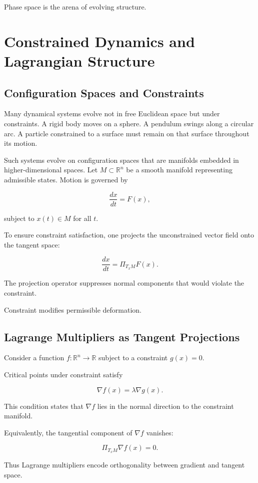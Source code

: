 \documentclass[12pt]{book}
\begin{document}
Phase space is the arena of evolving structure.

\chapter{Constrained Dynamics and Lagrangian Structure}

\section{Configuration Spaces and Constraints}

Many dynamical systems evolve not in free Euclidean space but under constraints. A rigid body moves on a sphere. A pendulum swings along a circular arc. A particle constrained to a surface must remain on that surface throughout its motion.

Such systems evolve on configuration spaces that are manifolds embedded in higher-dimensional spaces. Let $M \subset \mathbb{R}^n$ be a smooth manifold representing admissible states. Motion is governed by

\[
\frac{dx}{dt} = F(x),
\]

subject to $x(t) \in M$ for all $t$.

To ensure constraint satisfaction, one projects the unconstrained vector field onto the tangent space:

\[
\frac{dx}{dt} = \Pi_{T_x M} F(x).
\]

The projection operator suppresses normal components that would violate the constraint.

Constraint modifies permissible deformation.

\section{Lagrange Multipliers as Tangent Projections}

Consider a function $f : \mathbb{R}^n \to \mathbb{R}$ subject to a constraint $g(x) = 0$.

Critical points under constraint satisfy

\[
\nabla f(x) = \lambda \nabla g(x).
\]

This condition states that $\nabla f$ lies in the normal direction to the constraint manifold.

Equivalently, the tangential component of $\nabla f$ vanishes:

\[
\Pi_{T_x M} \nabla f(x) = 0.
\]

Thus Lagrange multipliers encode orthogonality between gradient and tangent space.
\end{document}
